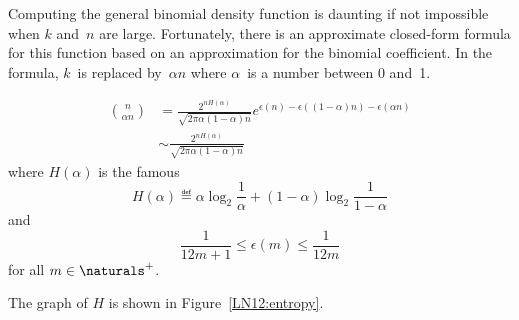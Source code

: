 Computing the general binomial density function is daunting if not
impossible when $k$ and~$n$ are large.  Fortunately, there is an
approximate closed-form formula for this function based on an
approximation for the binomial coefficient.  In the formula, $k$~is
replaced by~$\alpha n$ where $\alpha$~is a number between 0 and~1.
%
\begin{lemma}\label{LN12:bincoeff-bound}
\begin{align*}
\binom{n}{\alpha n}
        & = \frac{2^{n H(\alpha)}}{\sqrt{2 \pi \alpha (1 - \alpha) n}}
            e^{\epsilon(n) - \epsilon((1 - \alpha)n) - \epsilon(\alpha n)}\\
        & \sim \frac{2^{n H(\alpha)}}{\sqrt{2 \pi \alpha (1 - \alpha) n}}
\end{align*}
where $H(\alpha)$ is the famous 
\begin{equation*}
H(\alpha) \eqdef \alpha \log_2 \frac{1}{\alpha} +
                (1 - \alpha) \log_2 \frac{1}{1 - \alpha}
\end{equation*}
and
\begin{equation*}
    \frac{1}{12 m + 1} \le \epsilon(m) \le \frac{1}{12m}
\end{equation*}
for all $m \in \naturals^+$.
\end{lemma}

%
The graph of $H$ is shown in Figure~\ref{LN12:entropy}.

